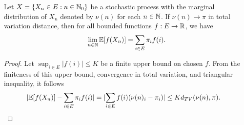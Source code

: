 \documentclass[a4paper,10pt,english]{article}
\begin{document}
\begin{lem}
Let $X = \{X_n \in E : n \in \mathbb{N}_0\}$ be a stochastic process with the marginal distribution of $X_n$ denoted by $\nu(n)$ for each $n \in \mathbb{N}$.  
If $\nu(n) \to \pi$ in total variation distance, then for all bounded functions $f: E \to \mathbb{R}$, 
we have
\begin{align*}
\lim_{n \in \mathbb{N}} \mathbb{E}[f(X_n)] = \sum_{i \in E} \pi_i f(i).
\end{align*}
\end{lem}
\begin{proof} 
Let $\sup_{i \in E}|f(i)| \leq K$ be a finite upper bound on chosen $f$. 
From the finiteness of this upper bound, convergence in total variation, and triangular inequality, it follows
\begin{align*}
 \lvert\mathbb{E}[f(X_n)]  - \sum_{i \in E}\pi_if(i) \rvert&=  \lvert\sum_{i \in E}f(i)(\nu(n)_i - \pi_i) \rvert \leq Kd_{TV}(\nu(n),\pi).
\end{align*}
\end{proof}
 
\end{document}

